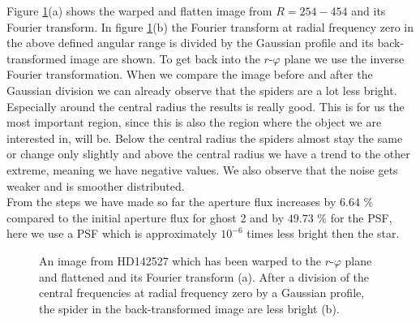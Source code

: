 Figure \ref{fig:HDsuppcentralfreq_R254_R454_-0.5to0.5}(a) shows the warped and flatten image from $R=254-454$ and its Fourier transform. In figure \ref{fig:HDsuppcentralfreq_R254_R454_-0.5to0.5}(b) the Fourier transform at radial frequency zero in the above defined angular range is divided by the Gaussian profile and its back-transformed image are shown. To get back into the $r$-$\varphi$ plane we use the inverse Fourier transformation. When we compare the image before and after the Gaussian division we can already observe that the spiders are a lot less bright. Especially around the central radius the results is really good. This is for us the most important region, since this is also the region where the object we are interested in, will be. Below the central radius the spiders almost stay the same or change only slightly and above the central radius we have a trend to the other extreme, meaning we have negative values. We also observe that the noise gets weaker and is smoother distributed.\\
From the steps we have made so far the aperture flux increases by $6.64$ \% compared to the initial aperture flux for ghost 2 and by $49.73$ \% for the PSF, here we use a PSF which is approximately $10^{-6}$ times less bright then the star. 
\begin{figure}[H]
	\centering
\caption{An image from HD142527 which has been warped to the $r$-$\varphi$ plane and flattened and its Fourier transform (a). After a division of the central frequencies at radial frequency zero by a Gaussian profile, the spider in the back-transformed image are less bright (b).}
\label{fig:HDsuppcentralfreq_R254_R454_-0.5to0.5}
\end{figure}

